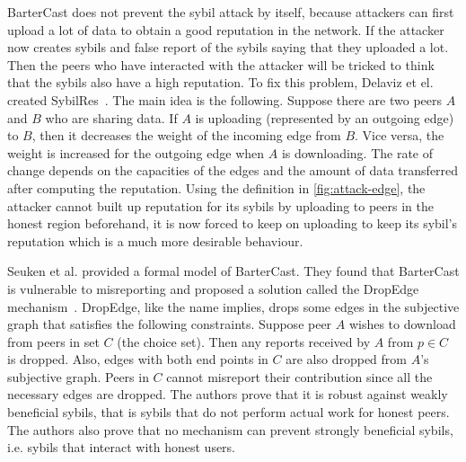 BarterCast does not prevent the sybil attack by itself, because attackers can
first upload a lot of data to obtain a good reputation in the network. If the
attacker now creates sybils and false report of the sybils saying that they
uploaded a lot. Then the peers who have interacted with the attacker will be
tricked to think that the sybils also have a high reputation. To fix this
problem, Delaviz et el. created SybilRes~\cite{delaviz2012sybilres}.
The main idea is the following. Suppose there are two peers $A$ and $B$ who are
sharing data. If $A$ is uploading (represented by an outgoing edge) to $B$, then
it decreases the weight of the incoming edge from $B$. Vice versa, the weight is
increased for the outgoing edge when $A$ is downloading. The rate of change
depends on the capacities of the edges and the amount of data transferred after
computing the reputation. Using the definition in \autoref{fig:attack-edge}, the
attacker cannot built up reputation for its sybils by uploading to peers in the
honest region beforehand, it is now forced to keep on uploading to keep its
sybil's reputation which is a much more desirable behaviour.

Seuken et al. provided a formal model of BarterCast. They found that BarterCast
is vulnerable to misreporting and proposed a solution called the DropEdge
mechanism~\cite{seuken2011sybil, seuken2014sybil}. DropEdge, like the name
implies, drops some edges in the subjective graph that satisfies the following
constraints. Suppose peer $A$ wishes to download from peers in set $C$ (the
choice set). Then any reports received by $A$ from $p \in C$ is dropped. Also,
edges with both end points in $C$ are also dropped from $A$'s subjective graph.
Peers in $C$ cannot misreport their contribution since all the necessary edges
are dropped. The authors prove that it is robust against weakly beneficial
sybils, that is sybils that do not perform actual work for honest peers. The
authors also prove that no mechanism can prevent strongly beneficial sybils,
i.e. sybils that interact with honest users.

